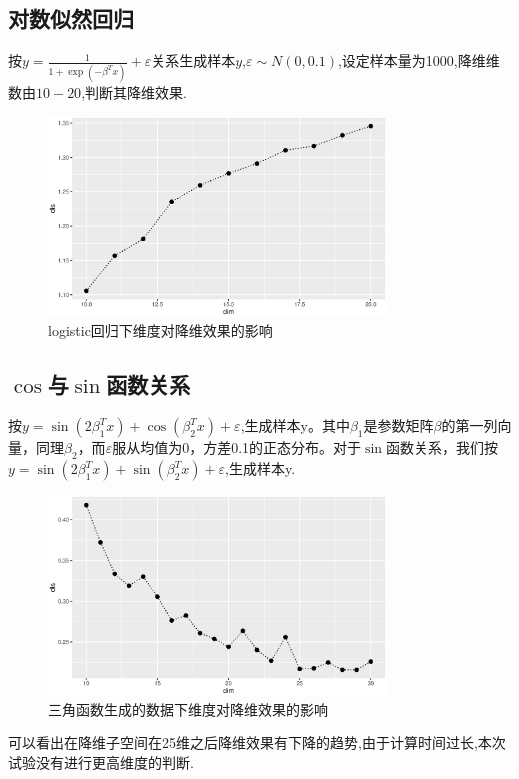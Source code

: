 \subsection{对数似然回归}

按$y = \frac{1}{1+\exp{(-\beta^Tx)}}+ \varepsilon$关系生成样本$y$,$\varepsilon \sim N(0,0.1)$,设定样本量为1000,降维维数由$10-20$,判断其降维效果.
\begin{figure}[H]
    \centering
    \includegraphics[width=0.8\textwidth]{image/logit_save.eps}
    \caption{logistic回归下维度对降维效果的影响}
\end{figure}


\subsection{$\cos$与$\sin$函数关系}

按$y=\sin(2\beta_1^Tx)+\cos(\beta_2^Tx)+\varepsilon$,生成样本y。其中$\beta_1$是参数矩阵$\beta$的第一列向量，同理$\beta_2$，而$\varepsilon$服从均值为0，方差0.1的正态分布。对于$\sin$函数关系，我们按$y=\sin(2\beta_1^Tx)+\sin(\beta_2^Tx)+\varepsilon$,生成样本y.
\begin{figure}[H]
    \centering
    \includegraphics[width=0.8\textwidth]{image/cos_sin_iht.eps}
    \caption{三角函数生成的数据下维度对降维效果的影响}
\end{figure}
可以看出在降维子空间在25维之后降维效果有下降的趋势,由于计算时间过长,本次试验没有进行更高维度的判断.


